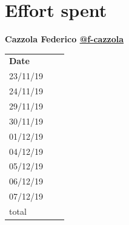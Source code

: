 \documentclass{article}
\begin{document}
\section{Effort spent}
	\begin{center}
		{\bf Cazzola Federico \href{https://github.com/f-cazzola}{@f-cazzola} }
		\vspace{2mm}

			\begin{tabular}{p{1.3cm}|p{1.8cm}|p{6.7cm}}
				\hline
				\bf Date & \bf \makebox[1.8cm][c]{Hours} & \bf \makebox[6.7cm][c]{Description} \\
				23/11/19 & \makebox[1.8cm][c]{2} & \makebox[6.7cm][c]{Architectural design}\\
				24/11/19 & \makebox[1.8cm][c]{3} & \makebox[6.7cm][c]{Architectural design}\\
				29/11/19 & \makebox[1.8cm][c]{2} & \makebox[6.7cm][c]{Architectural design}\\
				30/11/19 & \makebox[1.8cm][c]{6} & \makebox[6.7cm][c]{Architectural design}\\
				01/12/19 & \makebox[1.8cm][c]{8} & \makebox[6.7cm][c]{Architectural design}\\
				04/12/19 & \makebox[1.8cm][c]{4} & \makebox[6.7cm][c]{UI design}\\
				05/12/19 & \makebox[1.8cm][c]{6} & \makebox[6.7cm][c]{UI design}\\
				06/12/19 & \makebox[1.8cm][c]{0} & \makebox[6.7cm][c]{}\\
				07/12/19 & \makebox[1.8cm][c]{0} & \makebox[6.7cm][c]{}\\
				\hline
				total    & \makebox[1.8cm][c]{31}
			\end{tabular}
	\end{center}
	\vspace{1cm}
\end{document}
